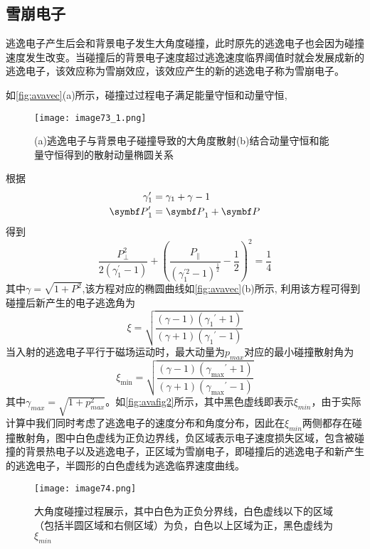 \vspace{3\baselineskip}

\subsection{雪崩电子}
逃逸电子产生后会和背景电子发生大角度碰撞，此时原先的逃逸电子也会因为碰撞速度发生改变。当碰撞后的背景电子速度超过逃逸速度临界阈值时就会发展成新的逃逸电子，该效应称为雪崩效应，该效应产生的新的逃逸电子称为雪崩电子。
\par 如\autoref{fig:avavec}(a)所示，碰撞过过程电子满足能量守恒和动量守恒\cite{RN1941},
\begin{figure}[ht]
\centering
\texttt{[image: image73\_1.png]}
\caption{\label{fig:avavec}(a)逃逸电子与背景电子碰撞导致的大角度散射(b)结合动量守恒和能量守恒得到的散射动量椭圆关系
}
\end{figure}
 根据
\begin{align}
\gamma_{1}^{\prime} & = \gamma_{1}+\gamma-1 \\
{\vP_{1}^{\prime}} & = {\vP_{1}}+{\vP}
\end{align}
得到
\begin{equation}
\frac{P_{\perp}^{2}}{2\left(\gamma_{1}^{\prime}-1\right)}+\left(\frac{P_{\|}}{\left(\gamma_{1}^{\prime 2}-1\right)^{\frac{1}{2}}}-\frac{1}{2}\right)^{2}=\frac{1}{4}
\end{equation}
其中$\gamma=\sqrt{1+P^{2}}$,该方程对应的椭圆曲线如\autoref{fig:avavec}(b)所示,
利用该方程可得到碰撞后新产生的电子逃逸角为\cite{RN1811,RN1809}
\begin{equation}
\xi=\sqrt{\frac{(\gamma-1)\left(\gamma_{1}{ }^{\prime}+1\right)}{(\gamma+1)\left(\gamma_{1}{ }^{\prime}-1\right)}}
\end{equation}
当入射的逃逸电子平行于磁场运动时，最大动量为$p_{max}$对应的最小碰撞散射角为
\begin{equation}
\xi_{\min }=\sqrt{\frac{(\gamma-1)\left(\gamma_{\max }{ }^{\prime}+1\right)}{(\gamma+1)\left(\gamma_{\max }{ }^{\prime}-1\right)}}
\end{equation}
其中$γ_{max}=\sqrt{1+p_{max}^2 }$。如\autoref{fig:avafig2}所示，其中黑色虚线即表示$ξ_{min}$，由于实际计算中我们同时考虑了逃逸电子的速度分布和角度分布，因此在$ξ_{min}$两侧都存在碰撞散射角，图中白色虚线为正负边界线，负区域表示电子速度损失区域，包含被碰撞的背景热电子以及逃逸电子，正区域为雪崩电子，即碰撞后的逃逸电子和新产生的逃逸电子，半圆形的白色虚线为逃逸临界速度曲线。
\begin{figure}
\centering
\texttt{[image: image74.png]}
\caption{\label{fig:avafig2}大角度碰撞过程展示，其中白色为正负分界线，白色虚线以下的区域（包括半圆区域和右侧区域）为负，白色以上区域为正，黑色虚线为$ξ_{min}$}
\end{figure}
